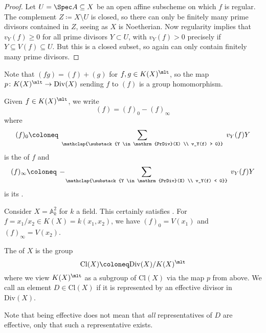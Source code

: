 \documentclass[wip, algebra]{bsteffan-lecturenotes}
\newcommand{\A}{\mathbb{A}}
\newcommand{\Div}{\mathrm{Div}}
\newcommand{\PrDiv}{\mathrm{PrDiv}}
\newcommand{\Cl}{\mathrm{Cl}}
\begin{document}
\begin{proof}
	Let $U = \Spec A \subseteq X$ be an open affine subscheme on which $f$ is regular. 
	The complement $Z \coloneq X \setminus U$ is closed, so there can only be finitely many prime divisors contained in $Z$, seeing as $X$ is Noetherian.
	Now regularity implies that $v_Y(f) \geq 0$ for all prime divisors $Y \subset U$, with $v_Y(f) > 0$ precisely if $Y \subseteq V(f) \subseteq U$. 
	But this is a closed subset, so again can only contain finitely many prime divisors.
\end{proof}
Note that $(fg) = (f) + (g)$ for $f, g \in K(X)^\mlt$, so the map $p\colon K(X)^\mlt \to \Div(X)$ sending $f$ to $(f)$ is a group homomorphism.
\begin{definition}
	Given $f \in K(X)^\mlt$, we write
	\begin{equation*}
		(f) = (f)_0 - (f)_\infty
	\end{equation*}
	where 
	\begin{equation*}
		(f)_0 \coloneq \;\sum_{\mathclap{\substack{Y \in \PrDiv(X) \\ v_Y(f) > 0}}}\; v_Y(f) Y
	\end{equation*}
	is the  of $f$ and 
	\begin{equation*}
		(f)_\infty \coloneq \,-\!\sum_{\mathclap{\substack{Y \in \PrDiv(X) \\ v_Y(f) < 0}}}\; v_Y(f) Y
	\end{equation*}
	is its .
\end{definition}
\begin{example}
	Consider $X = \A^2_k$ for $k$ a field.
	This certainly satisfies .
	For $f = x_1 / x_2 \in K(X) = k(x_1, x_2)$, we have $(f)_0 = V(x_1)$ and $(f)_\infty = V(x_2)$.
\end{example}
\begin{definition}
	The  of $X$ is the group
	\begin{equation*}
		\Cl(X) \coloneq \Div(X) / K(X)^\mlt
	\end{equation*}
	where we view $K(X)^\mlt$ as a subgroup of $\Cl(X)$ via the map $p$ from above.
	We call an element $D \in \Cl(X)$  if it is represented by an effective divisor in $\Div(X)$.
\end{definition}
Note that being effective does not mean that \emph{all} representatives of $D$ are effective, only that such a representative exists.
\end{document}
